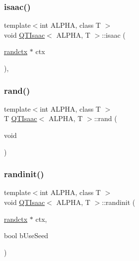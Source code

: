 \mbox{\label{classQTIsaac_aa92e5e94f65d61e9395664dc5d2cf9b3}} 
\subsubsection{\texorpdfstring{isaac()}{isaac()}}
{\footnotesize\ttfamily template$<$int A\+L\+P\+HA, class T $>$ \\
void \hyperlink{classQTIsaac}{Q\+T\+Isaac}$<$ A\+L\+P\+HA, T $>$\+::isaac (\begin{DoxyParamCaption}\item[{\hyperlink{structQTIsaac_1_1randctx}{randctx} $\ast$}]{ctx }\end{DoxyParamCaption})\hspace{0.3cm}{\ttfamily [protected]}, {\ttfamily [virtual]}}

\mbox{\label{classQTIsaac_a43a34ab9819572127d4f13e7344b2a95}} 
\subsubsection{\texorpdfstring{rand()}{rand()}}
{\footnotesize\ttfamily template$<$int A\+L\+P\+HA, class T $>$ \\
T \hyperlink{classQTIsaac}{Q\+T\+Isaac}$<$ A\+L\+P\+HA, T $>$\+::rand (\begin{DoxyParamCaption}\item[{void}]{ }\end{DoxyParamCaption})\hspace{0.3cm}{\ttfamily [inline]}}

\mbox{\label{classQTIsaac_a5d1004b08f22ef74794597d139ca31b7}} 
\subsubsection{\texorpdfstring{randinit()}{randinit()}}
{\footnotesize\ttfamily template$<$int A\+L\+P\+HA, class T $>$ \\
void \hyperlink{classQTIsaac}{Q\+T\+Isaac}$<$ A\+L\+P\+HA, T $>$\+::randinit (\begin{DoxyParamCaption}\item[{\hyperlink{structQTIsaac_1_1randctx}{randctx} $\ast$}]{ctx,  }\item[{bool}]{b\+Use\+Seed }\end{DoxyParamCaption})\hspace{0.3cm}{\ttfamily [virtual]}}

